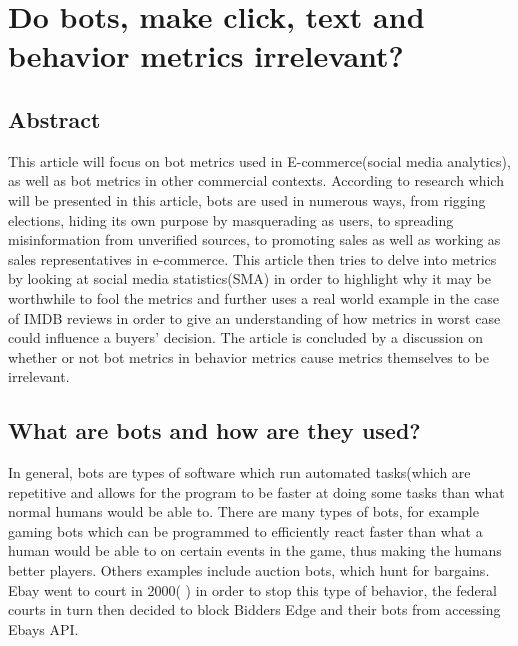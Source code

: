 \chapter[Bot Metrics]{Do bots,  make click, text and behavior metrics irrelevant?}
\section{Abstract}
This article will focus on bot metrics used in E-commerce(social media analytics), as well as bot metrics in other commercial contexts. According to research which will be presented in this article, bots are used in numerous ways, from rigging elections, hiding its own purpose by masquerading as users, to spreading misinformation from unverified sources, to promoting sales as well as working as sales representatives in e-commerce. This article then tries to delve into metrics by looking at social media statistics(SMA) in order to highlight why it may be worthwhile to fool the metrics and further uses a real world example in the case of IMDB reviews in order to give an understanding of how metrics in worst case could influence a buyers' decision. The article is concluded by a discussion on whether or not bot metrics in behavior metrics cause metrics themselves to be irrelevant. 

\section{What are bots and how are they used?}
In general, bots are types of software which run automated tasks(which are repetitive and allows for the program to be faster at doing some tasks than what normal humans would be able to. There are many types of bots, for example gaming bots which can be programmed to efficiently react faster than what a human would be able to on certain events in the game, thus making the humans better players. Others examples include auction bots, which hunt for bargains. Ebay went to court in 2000( \cite{Computerworld:Ebay}) in order to stop this type of behavior, the federal courts in turn then decided to block Bidders Edge and their bots from accessing Ebays API.
\\

